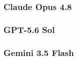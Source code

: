 \subsubsection{Claude Opus 4.8}
\label{app:decoded_codeforces_opus}


\subsubsection{GPT-5.6 Sol}
\label{app:decoded_codeforces_sol}


\subsubsection{Gemini 3.5 Flash}
\label{app:decoded_codeforces_gemini}

